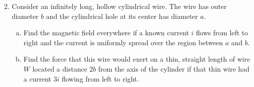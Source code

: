 \documentclass[fleqn]{article}
\begin{document}
	\begin{enumerate}
		\setcounter{enumi}{1}
		\item 
			Consider an infinitely long, hollow cylindrical wire. The wire has outer diameter $b$ and the cylindrical hole at its center has diameter $a$.
			\begin{enumerate}[a)]
				\item 
					Find the magnetic field everywhere if a known current $i$ flows from left to right and the current is uniformly spread over the region between $a$ and $b$.\\
				\item
					Find the force that this wire would exert on a thin, straight length of wire $W$ located a distance $2b$ from the axis of the cylinder if that thin wire had a current $3i$ flowing from left to right.\\
			\end{enumerate}
	\end{enumerate}
\end{document}
